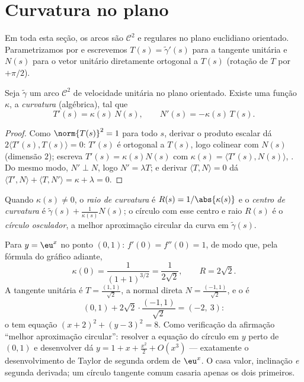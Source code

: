 \section{Curvatura no plano}

Em toda esta seção, os arcos são $\mathcal{C}^2$ e regulares no
plano euclidiano orientado. Parametrizamos por  e
escrevemos $T(s) = \tilde\gamma'(s)$ para a tangente unitária e $N(s)$
para o vetor unitário diretamente ortogonal a $T(s)$ (rotação de
$T$ por $+\pi/2$).

\begin{theorem}\label{thm:b2:curves:frenet2d}
Seja $\tilde\gamma$ um arco $\mathcal{C}^2$ de velocidade unitária no
plano orientado. Existe uma função  $\kappa$, a
\emph{curvatura} (algébrica), tal que
\[
T'(s) = \kappa(s)\, N(s),
\qquad
N'(s) = -\kappa(s)\, T(s).
\]
\end{theorem}

\begin{proof}
Como $\norm{T(s)}^2 = 1$ para todo $s$, derivar o produto
escalar dá $2\langle T'(s), T(s)\rangle = 0$: $T'(s)$ é ortogonal a
$T(s)$, logo colinear com $N(s)$ (dimensão $2$); escreva $T'(s)
= \kappa(s) N(s)$ com $\kappa(s) = \langle T'(s), N(s)\rangle$,
. Do mesmo modo, $N' \perp N$, logo $N' = \lambda T$; e
derivar $\langle T, N\rangle = 0$ dá $\langle T', N\rangle +
\langle T, N'\rangle = \kappa + \lambda = 0$.
\end{proof}

\begin{definition}\label{def:b2:curves:curvature}
Quando $\kappa(s) \neq 0$, o \emph{raio de
curvatura} é $R(s) =
1/\abs{\kappa(s)}$ e o \emph{centro de curvatura} é
$\tilde\gamma(s) + \frac{1}{\kappa(s)} N(s)$; o círculo com esse
centro e raio $R(s)$ é o \emph{círculo osculador}, a
melhor aproximação circular da curva em $\tilde\gamma(s)$.
\end{definition}

\begin{example}\label{ex:b2:curves:oscexp}
Para $y = \eu^x$ no ponto $(0, 1)$: $f'(0) = f''(0) = 1$,
de modo que, pela fórmula do gráfico adiante,
\[
\kappa(0) = \frac{1}{(1 + 1)^{3/2}} = \frac1{2\sqrt2},
\qquad R = 2\sqrt2 .
\]
A tangente unitária é $T = \frac{(1, 1)}{\sqrt2}$, a normal
direta $N = \frac{(-1, 1)}{\sqrt2}$, e o  é
\[
(0, 1) + 2\sqrt2\cdot\frac{(-1, 1)}{\sqrt2} = (-2,\ 3) :
\]
o  tem equação $(x + 2)^2 + (y - 3)^2 =
8$. Como verificação da afirmação ``melhor aproximação circular'':
resolver a equação do círculo em $y$ perto de $(0,1)$ e
desenvolver dá $y = 1 + x + \frac{x^2}2 + O(x^3)$ ---
exatamente o desenvolvimento de Taylor de segunda ordem de $\eu^x$. O
 casa valor, inclinação \emph{e} segunda
derivada; um círculo tangente comum casaria apenas os
dois primeiros.
\end{example}

